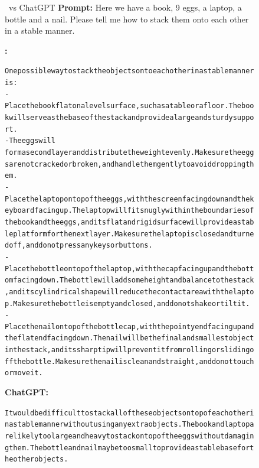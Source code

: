     
    \begin{figure}
    \begin{AIbox}{\DV\ vs ChatGPT}
    {\bf Prompt:} Here we have a book, 9 eggs, a laptop, a bottle and a nail. Please tell me how to stack them onto each other in a stable manner. \\
    
    \parbox[t]{\textwidth}
    {{\bf \DV:} \scriptsize \begin{alltt}
    
    One possible way to stack the objects onto each other in a stable manner is:\\
    
    - Place the book flat on a level surface, such as a table or a floor. The book will serve as the base of the stack and provide a large and sturdy support.\\
    -  The eggs will \\form a second layer and distribute the weight evenly. Make sure the eggs are not cracked or broken, and handle them gently to avoid dropping them.\\
    - Place the laptop on top of the eggs, with the screen facing down and the keyboard facing up. The laptop will fit snugly within the boundaries of the book and the eggs, and its flat and rigid surface will provide a stable platform for the next layer. Make sure the laptop is closed and turned off, and do not press any keys or buttons.\\
    - Place the bottle on top of the laptop, with the cap facing up and the bottom facing down. The bottle will add some height and balance to the stack, and its cylindrical shape will reduce the contact area with the laptop. Make sure the bottle is empty and closed, and do not shake or tilt it.\\
    - Place the nail on top of the bottle cap, with the pointy end facing up and the flat end facing down. The nail will be the final and smallest object in the stack, and its sharp tip will prevent it from rolling or sliding off the bottle. Make sure the nail is clean and straight, and do not touch or move it.\\
    
    \end{alltt}}
    \parbox[t]{\textwidth}{{\bf ChatGPT:} \scriptsize \begin{alltt}
    It would be difficult to stack all of these objects on top of each other in a stable manner without using any extra objects. The book and laptop are likely too large and heavy to stack on top of the eggs without damaging them. The bottle and nail may be too small to provide a stable base for the other objects.\\
    

\end{alltt}}
\end{AIbox}
\end{figure}
